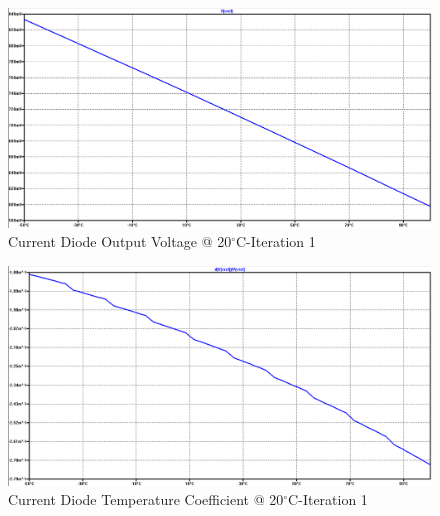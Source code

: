 \documentclass[conference]{IEEEtran}
\begin{document}
\begin{figure}[!htbp]
  	\centering
  	\includegraphics[scale=0.35]{images/appendix/cd1-vref.png}
  	\caption[output-z-meas]{Current Diode Output Voltage @ 20$^{\circ}$C-Iteration 1}
  	\label{fig:cd1-vref}
	\end{figure}
\begin{figure}[!htbp]
  	\centering
  	\includegraphics[scale=0.35]{images/appendix/cd1-tempco.png}
  	\caption[output-z-meas]{Current Diode Temperature Coefficient @ 20$^{\circ}$C-Iteration 1}
  	\label{fig:cd1-tempco}
	\end{figure}
\end{document}
